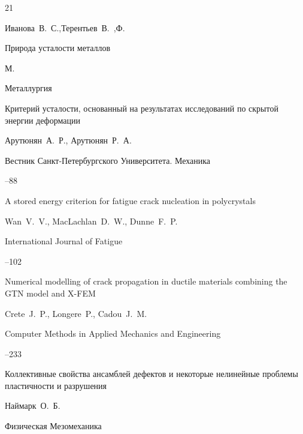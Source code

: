 \begin{thebibliography}{21}

\by Иванова~В.~С.,Терентьев~В.~,Ф.

\book Природа усталости металлов

\publaddr М.

\publ Металлургия






\paper Критерий усталости, основанный на результатах исследований по скрытой энергии деформации

\by Арутюнян~А.~Р., Арутюнян~Р.~А.

\jour Вестник Санкт-Петербургского Университета. Механика



--88




\paper A stored energy criterion for fatigue crack nucleation in polycrystals

\by Wan~V.~V., MacLachlan~D.~W., Dunne~F.~P.

\jour International Journal of Fatigue



--102




\paper Numerical modelling of crack propagation in ductile materials combining the GTN model and X-FEM

\by Crete~J.~P., Longere~P., Cadou~J.~M.

\jour Computer Methods in Applied Mechanics and Engineering



--233




\paper Коллективные свойства ансамблей дефектов и некоторые нелинейные проблемы пластичности и разрушения

\by Наймарк~О.~Б.

\jour Физическая Мезомеханика



\end{thebibliography}
